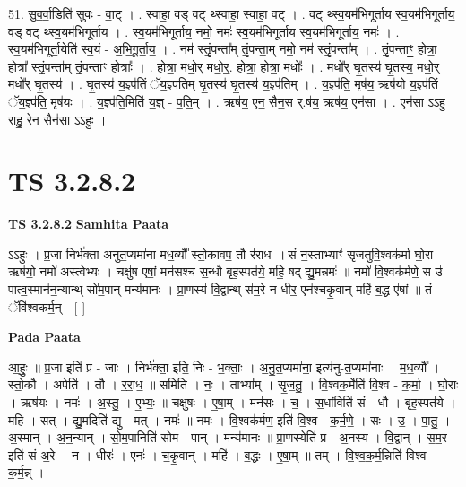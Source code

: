 \documentclass[17pt]{extarticle}
\begin{document}
51. सु॒व॒र्वा॒डिति॑ सुवः - वा॒ट् । . स्वाहा॒ वड् वट् थ्स्वाहा॒ स्वाहा॒ वट् । . वट् थ्स्व॒यम॑भिगूर्ताय स्व॒यम॑भिगूर्ताय॒ वड् वट् थ्स्व॒यम॑भिगूर्ताय । . स्व॒यम॑भिगूर्ताय॒ नमो॒ नमः॑ स्व॒यम॑भिगूर्ताय स्व॒यम॑भिगूर्ताय॒ नमः॑ । . स्व॒यम॑भिगूर्ता॒येति॑ स्व॒यं - अ॒भि॒गू॒र्ता॒य॒ । . नम॑ स्तृं॒पन्ता᳚म् तृं॒पन्ता॒म् नमो॒ नम॑ स्तृं॒पन्ता᳚म् । . तृं॒पन्ताꣳ॒॒ होत्रा॒ होत्रा᳚ स्तृं॒पन्ता᳚म् तृं॒पन्ताꣳ॒॒ होत्राः᳚ । . होत्रा॒ मधो॒र् मधो॒र्॒. होत्रा॒ होत्रा॒ मधोः᳚ । . मधो᳚र् घृ॒तस्य॑ घृ॒तस्य॒ मधो॒र् मधो᳚र् घृ॒तस्य॑ । . घृ॒तस्य॑ य॒ज्ञ्प॑तिं ॅय॒ज्ञ्प॑तिम् घृ॒तस्य॑ घृ॒तस्य॑ य॒ज्ञ्प॑तिम् । . य॒ज्ञ्प॑ति॒ मृष॑य॒ ऋष॑यो य॒ज्ञ्प॑तिं ॅय॒ज्ञ्प॑ति॒ मृष॑यः । . य॒ज्ञ्प॑ति॒मिति॑ य॒ज्ञ् - प॒ति॒म् । . ऋष॑य॒ एन॒ सैन॒स र्.ष॑य॒ ऋष॑य॒ एन॑सा । . एन॑सा ऽऽहु राहु॒ रेन॒ सैन॑सा ऽऽहुः । \newline


\section{ TS 3.2.8.2 }

\textbf{TS 3.2.8.2 } \newline
\textbf{Samhita Paata} \newline

ऽऽहुः । प्र॒जा निर्भ॑क्ता अनुत॒प्यमा॑ना मध॒व्यौ᳚ स्तो॒कावप॒ तौ र॑राध ॥ सं न॒स्ताभ्याꣳ॑ सृजतुवि॒श्वक॑र्मा घो॒रा ऋष॑यो॒ नमो॑ अस्त्वेभ्यः । चक्षु॑ष एषां॒ मन॑सश्च स॒न्धौ बृह॒स्पत॑ये॒ महि॒ षद् द्यु॒मन्नमः॑ ॥ नमो॑ वि॒श्वक॑र्मणे॒ स उ॑ पात्व॒स्मान॑न॒न्यान्थ्-सो॑म॒पान् मन्य॑मानः । प्रा॒णस्य॑ वि॒द्वान्थ् स॑म॒रे न धीर॒ एन॑श्चकृ॒वान् महि॑ ब॒द्ध ए॑षां ॥ तं ॅवि॑श्वकर्म॒न् - [  ] \newline

\textbf{Pada Paata} \newline

आ॒हुः॒ ॥ प्र॒जा इति॑ प्र - जाः । निर्भ॑क्ता॒ इति॒ निः - भ॒क्ताः॒ । अ॒नु॒त॒प्यमा॑ना॒ इत्य॑नु-त॒प्यमा॑नाः । म॒ध॒व्यौ᳚ । स्तो॒कौ । अपेति॑ । तौ । र॒रा॒ध॒ ॥ समिति॑ । नः॒ । ताभ्या᳚म् । सृ॒ज॒तु॒ । वि॒श्वक॒र्मेति॑ वि॒श्व - क॒र्मा॒ । घो॒राः । ऋष॑यः । नमः॑ । अ॒स्तु॒ । ए॒भ्यः॒ ॥ चक्षु॑षः । ए॒षा॒म् । मन॑सः । च॒ । स॒धांविति॑ सं - धौ । बृह॒स्पत॑ये । महि॑ । सत् । द्यु॒मदिति॑ द्यु - मत् । नमः॑ ॥ नमः॑ । वि॒श्वक॑र्मण॒ इति॑ वि॒श्व - क॒र्म॒णे॒ । सः । उ॒ । पा॒तु॒ । अ॒स्मान् । अ॒न॒न्यान् । सो॒म॒पानिति॑ सोम - पान् । मन्य॑मानः ॥ प्रा॒णस्येति॑ प्र - अ॒नस्य॑ । वि॒द्वान् । स॒म॒र इति॑ सं-अ॒रे । न । धीरः॑ । एनः॑ । च॒कृ॒वान् । महि॑ । ब॒द्धः । ए॒षा॒म् ॥ तम् । वि॒श्व॒क॒र्म॒न्निति॑ विश्व - क॒र्म॒न्न् ।  \newline
\end{document}
